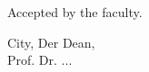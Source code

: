 \makeatletter
\begin{titlepage}
    \begin{center}


        \vspace{3cm}
        Accepted by the faculty.

        \vfill
        City, \@date \hfill Der Dean, \\
        \hfill Prof. Dr. ... 
    \end{center}
\end{titlepage}
\makeatother
